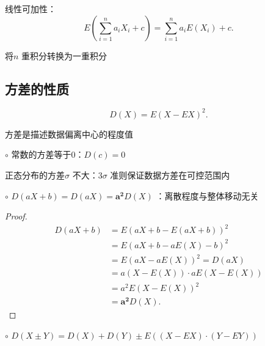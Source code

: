  \begin{notation}
     线性可加性：\[
         E\left( \sum_{i=1}^{n} a_iX_i+c \right) =\sum_{i=1}^{n} a_iE\left( X_i \right) +c
     .\] 
     
     将$n$ 重积分转换为一重积分
 \end{notation}
\subsection{方差的性质}%
\label{sub:方差的性质}
\[
    D\left( X \right) =E\left( X-EX \right) ^2
.\] 
\begin{notation}
    方差是描述数据偏离中心的程度值
\end{notation}
$\circ$ 常数的方差等于0：$D\left( c \right) =0$
\begin{notation}
    正态分布的方差$\sigma$ 不大：$3\sigma$ 准则保证数据方差在可控范围内
\end{notation}
$\circ$ $D\left( aX+b \right) =D\left( aX \right)=\bm{a^2}D\left( X \right)  $ ：离散程度与整体移动无关
\begin{proof}
    \begin{align*}
        D\left( aX+b \right) &= E\left( aX+b-E\left( aX+b \right)  \right) ^2 \\
        &= E\left( aX+b-aE\left( X \right) -b \right) ^2 \\
        &= E\left( aX-aE\left( X \right)  \right) ^2 =D\left( aX \right) \\
        &= a\left( X-E\left( X \right)  \right) \cdot aE\left( X-E\left( X \right)  \right)  \\
        &= a^2E\left( X-E(X) \right)^2 \\
        &= \bm{a^2}D\left( X \right) 
    .\end{align*}
\end{proof}
$\circ$ $D\left( X\pm Y \right) =D\left( X \right) +D\left( Y \right) \pm E\left( \left( X-EX \right) \cdot \left( Y-EY \right)  \right) $
